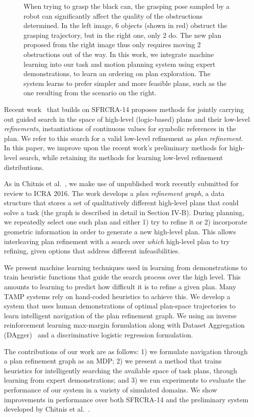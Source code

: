 \begin{figure}[t]
  \caption{\small{When trying to grasp the black can, the grasping pose sampled by a robot can
significantly affect the quality of the obstructions determined. In the left image, 6 objects (shown in red) obstruct the
grasping trajectory, but in the right one, only 2 do. The new plan proposed from the right image thus only
requires moving 2 obstructions out of the way. In this work, we integrate machine learning into our task and
motion planning system using expert demonstrations, to learn an ordering on plan exploration. The system
learns to prefer simpler and more feasible plans, such as the one resulting from the scenario on the right.}}
  \label{fig:cover}
\end{figure}

Recent work~\cite{chitnis2015mlpc} that builds on SFRCRA-14 proposes
methods for jointly carrying out guided search in the space of
high-level (logic-based) plans and their low-level
\emph{refinements}, instantiations of continuous values for
symbolic references in the plan. We refer to this search for a valid low-level
refinement as \emph{plan refinement}. In this paper, we improve upon
the recent work's preliminary methods for high-level search, while retaining its methods
for learning low-level refinement distributions.

As in Chitnis et al.~\cite{chitnis2015mlpc}, we make use of unpublished work
recently submitted for review to ICRA 2016. The work develops
a \emph{plan refinement graph}, a data structure that stores a
set of qualitatively different high-level plans that could solve a task (the graph is
described in detail in Section IV-B).
During planning, we repeatedly select one such plan and either 1) try to
refine it or 2) incorporate geometric information in order to generate a new high-level
plan. This allows interleaving plan refinement with a
search over \emph{which} high-level plan to try refining, given options
that address different infeasibilities.

We present machine learning techniques used in learning from demonstrations
to train heuristic functions that guide the search process over the high level.
This amounts to learning to predict how difficult it is to refine a given plan.
Many TAMP systems rely on hand-coded heuristics to achieve this. We develop a system that uses human
demonstrations of optimal plan-space trajectories to learn intelligent navigation
of the plan refinement graph. We using an inverse reinforcement learning
max-margin formulation along with Dataset Aggregation (DAgger)~\cite{ross2010dagger} and a discriminative logistic regression formulation.

The contributions of our work are as follows: 1) we formulate navigation through a plan
refinement graph as an MDP; 2) we present a method that trains
heuristics for intelligently searching the available space of task plans, through learning
from expert demonstrations; and 3)
we run experiments to evaluate the performance of our system in a
variety of simulated domains. We show improvements in performance over both SFRCRA-14
and the preliminary system developed by Chitnis et al.~\cite{chitnis2015mlpc}.
